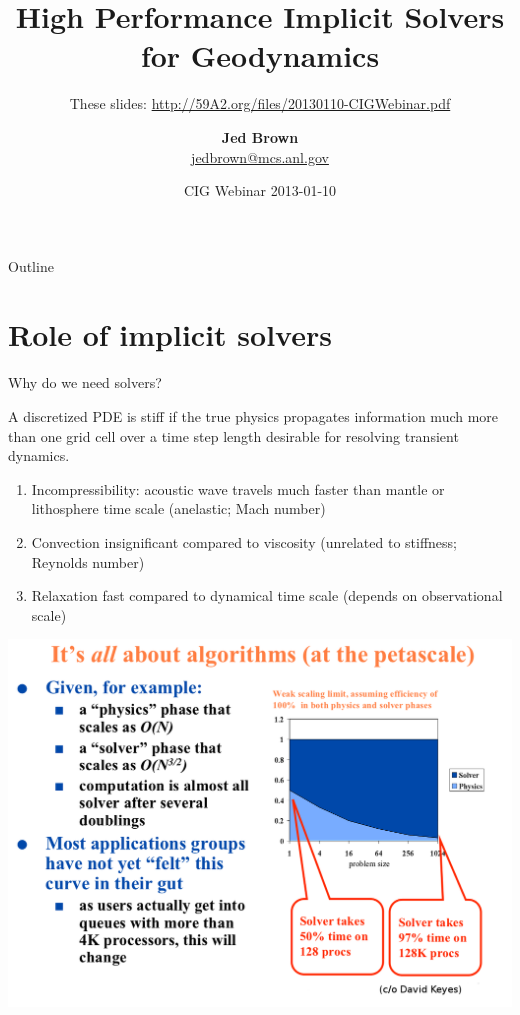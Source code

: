 \documentclass{beamer}
\title{High Performance Implicit Solvers for Geodynamics}
\subtitle{These slides: \url{http://59A2.org/files/20130110-CIGWebinar.pdf}}
\author{{\bf Jed Brown} \\ \url{jedbrown@mcs.anl.gov}}
\institute
{
  {Mathematics and Computer Science Division, Argonne National Laboratory} \\
}
\date{CIG Webinar 2013-01-10}
\begin{document}
\lstset{language=C}
\normalem

\begin{frame}
  \titlepage
\end{frame}

\begin{frame}{Outline}
  \tableofcontents
\end{frame}

\section{Role of implicit solvers}
\begin{frame}{Why do we need solvers?}
  \begin{definition}[Stiffness]
    A discretized PDE is stiff if the true physics propagates information much more than one grid cell over a time step length desirable for resolving transient dynamics.
  \end{definition}
  \vspace{-1.5em}
  \vspace{-1.5em}
  \begin{enumerate}
  \item<3-> Incompressibility: acoustic wave travels much faster than mantle or lithosphere time scale (anelastic; Mach number)
  \item<4-> Convection insignificant compared to viscosity (unrelated to stiffness; Reynolds number)
  \item<5-> Relaxation fast compared to dynamical time scale (depends on observational scale)
  \end{enumerate}
\end{frame}
\begin{frame}
  \includegraphics[width=1.05\textwidth]{figures/KeyesAllAboutAlgorithms}
\end{frame}
\end{document}
